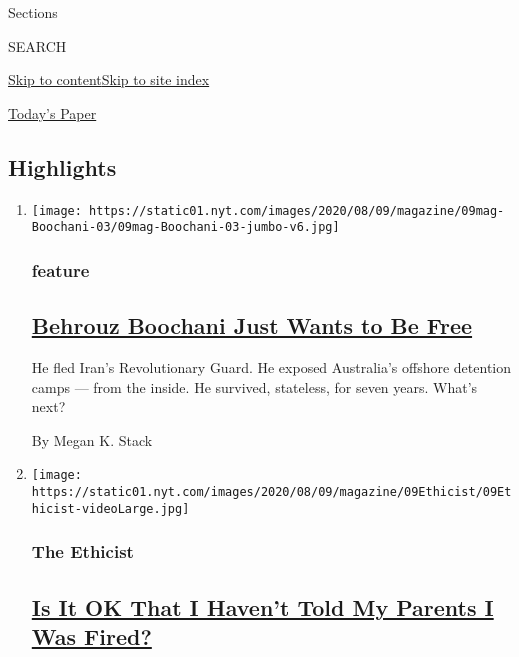 Sections

SEARCH

\protect\hyperlink{site-content}{Skip to
content}\protect\hyperlink{site-index}{Skip to site index}

\href{https://myaccount.nytimes.com/auth/login?response_type=cookie\&client_id=vi}{}

\href{https://www.nytimes.com/section/todayspaper}{Today's Paper}

\hypertarget{highlights}{%
\subsection{Highlights}\label{highlights}}

\begin{enumerate}
\def\labelenumi{\arabic{enumi}.}
\item
  \texttt{[image: https://static01.nyt.com/images/2020/08/09/magazine/09mag-Boochani-03/09mag-Boochani-03-jumbo-v6.jpg]}

  \hypertarget{feature}{%
  \subsubsection{feature}\label{feature}}

  \hypertarget{behrouz-boochani-just-wants-to-be-free}{%
  \subsection{\texorpdfstring{\href{/2020/08/04/magazine/behrouz-boochani-australia.html}{Behrouz
  Boochani Just Wants to Be
  Free}}{Behrouz Boochani Just Wants to Be Free}}\label{behrouz-boochani-just-wants-to-be-free}}

  He fled Iran's Revolutionary Guard. He exposed Australia's offshore
  detention camps --- from the inside. He survived, stateless, for seven
  years. What's next?

  By Megan K. Stack
\item
  \texttt{[image: https://static01.nyt.com/images/2020/08/09/magazine/09Ethicist/09Ethicist-videoLarge.jpg]}

  \hypertarget{the-ethicist}{%
  \subsubsection{The Ethicist}\label{the-ethicist}}

  \hypertarget{is-it-ok-that-i-havent-told-my-parents-i-was-fired}{%
  \subsection{\texorpdfstring{\href{/2020/08/04/magazine/jobs-unemployment-ethics.html}{Is
  It OK That I Haven't Told My Parents I Was
  Fired?}}{Is It OK That I Haven't Told My Parents I Was Fired?}}\label{is-it-ok-that-i-havent-told-my-parents-i-was-fired}}


\end{enumerate}
